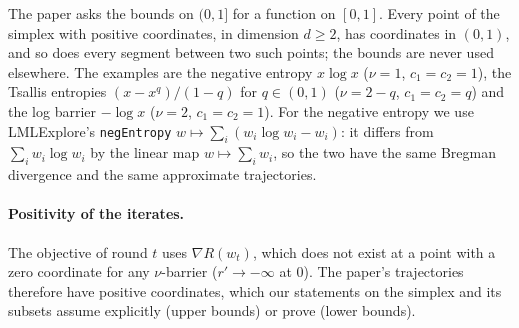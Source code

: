 The paper asks the bounds on $(0, 1]$ for a function on $[0, 1]$. Every point of the simplex with
positive coordinates, in dimension $d \ge 2$, has coordinates in $(0, 1)$, and so does every
segment between two such points; the bounds are never used elsewhere. The examples are the
negative entropy $x \log x$ ($\nu = 1$, $c_1 = c_2 = 1$), the Tsallis entropies
$(x - x^q)/(1 - q)$ for $q \in (0, 1)$ ($\nu = 2 - q$, $c_1 = c_2 = q$) and the log barrier
$-\log x$ ($\nu = 2$, $c_1 = c_2 = 1$). For the negative entropy we use LMLExplore's
\texttt{negEntropy} $w \mapsto \sum_i (w_i \log w_i - w_i)$: it differs from $\sum_i w_i \log w_i$
by the linear map $w \mapsto \sum_i w_i$, so the two have the same Bregman divergence and the
same approximate trajectories.

\paragraph{Positivity of the iterates.} The objective of round $t$ uses $\nabla R(w_t)$, which
does not exist at a point with a zero coordinate for any $\nu$-barrier ($r' \to -\infty$ at
$0$). The paper's trajectories therefore have positive coordinates, which our statements on the
simplex and its subsets assume explicitly (upper bounds) or prove (lower bounds).
